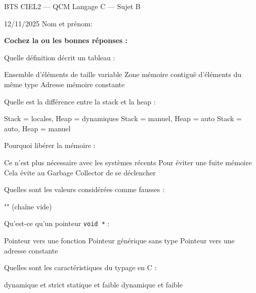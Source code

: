 \documentclass[12pt]{exam}
\begin{document}
\newpage
\setcounter{page}{1}


\begin{center}
\Large BTS CIEL2 — QCM Langage C — Sujet B
\end{center}
\begin{center}
12/11/2025 \hfill Nom et prénom:\enspace \hrulefill
\end{center}

\textbf{Cochez la ou les bonnes réponses :}

\begin{questions}

\question Quelle définition décrit un tableau :
\begin{checkboxes}
 \choice Ensemble d’éléments de taille variable
 \CorrectChoice Zone mémoire contiguë d’éléments du même type
 \CorrectChoice Adresse mémoire constante
\end{checkboxes}

\question Quelle est la différence entre la stack et la heap :
\begin{checkboxes}
 \CorrectChoice Stack = locales, Heap = dynamiques
 \choice Stack = manuel, Heap = auto
 \CorrectChoice Stack = auto, Heap = manuel
\end{checkboxes}

\question Pourquoi libérer la mémoire :
\begin{checkboxes}
 \choice Ce n'est plus nécessaire avec les systèmes récents
 \CorrectChoice Pour éviter une fuite mémoire
 \choice Cela évite au Garbage Collector de se déclencher
\end{checkboxes}

\question Quelles sont les valeurs considérées comme fausses :
\begin{checkboxes}
 \choice "" (chaîne vide)
\end{checkboxes}

\question Qu’est-ce qu’un pointeur \texttt{void *} :
\begin{checkboxes}
 \choice Pointeur vers une fonction
 \CorrectChoice Pointeur générique sans type
 \choice Pointeur vers une adresse constante
\end{checkboxes}

\question Quelles sont les caractéristiques du typage en C :
\begin{checkboxes}
 \choice dynamique et strict
 \CorrectChoice statique et faible
 \choice dynamique et faible
\end{checkboxes}


\end{questions}
\end{document}
